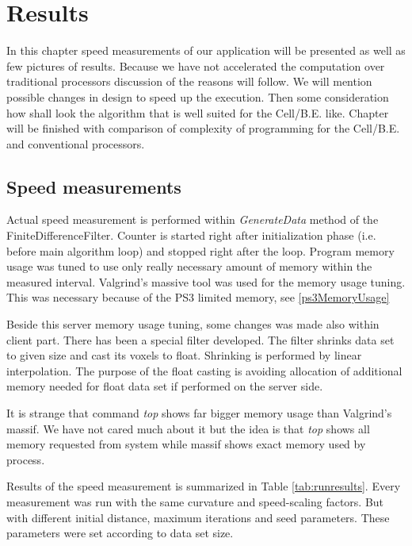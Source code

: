﻿\chapter{Results}

In this chapter speed measurements of our application will be presented as well as few pictures of results.
Because we have not accelerated the computation over traditional processors discussion of the reasons will follow.
We will mention possible changes in design to speed up the execution.
Then some consideration how shall look the algorithm that is well suited for the Cell/B.E. like.
Chapter will be finished with comparison of complexity of programming for the Cell/B.E. and conventional processors.

\section{Speed measurements}

\par
Actual speed measurement is performed within \emph{GenerateData} method of the FiniteDifferenceFilter.
Counter is started right after initialization phase (i.e. before main algorithm loop) and stopped right after the loop.
Program memory usage was tuned to use only really necessary amount of memory within the measured interval.
Valgrind's massive tool was used for the memory usage tuning.
This was necessary because of the PS3 limited memory, see \ref{ps3MemoryUsage}

\par
Beside this server memory usage tuning, some changes was made also within client part.
There has been a special filter developed.
The filter shrinks data set to given size and cast its voxels to float.
Shrinking is performed by linear interpolation.
The purpose of the float casting is avoiding allocation of additional memory needed for float data set if performed on the server side.

\par
It is strange that command \emph{top} shows far bigger memory usage than Valgrind's massif.
We have not cared much about it but the idea is that \emph{top} shows all memory requested from system while massif shows exact memory used by process.

\par
Results of the speed measurement is summarized in Table \ref{tab:runresults}.
Every measurement was run with the same curvature and speed-scaling factors.
But with different initial distance, maximum iterations and seed parameters.
These parameters were set according to data set size.

